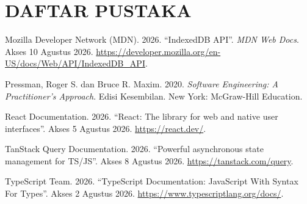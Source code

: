 \clearpage
\chapter*{DAFTAR PUSTAKA}

\begin{enumerate}[label={[\arabic*]}]
  \item Mozilla Developer Network (MDN). 2026. ``IndexedDB API''. \textit{MDN Web Docs}. Akses 10 Agustus 2026. \url{https://developer.mozilla.org/en-US/docs/Web/API/IndexedDB_API}.
  \item Pressman, Roger S. dan Bruce R. Maxim. 2020. \textit{Software Engineering: A Practitioner's Approach}. Edisi Kesembilan. New York: McGraw-Hill Education.
  \item React Documentation. 2026. ``React: The library for web and native user interfaces''. Akses 5 Agustus 2026. \url{https://react.dev/}.
  \item TanStack Query Documentation. 2026. ``Powerful asynchronous state management for TS/JS''. Akses 8 Agustus 2026. \url{https://tanstack.com/query}.
  \item TypeScript Team. 2026. ``TypeScript Documentation: JavaScript With Syntax For Types''. Akses 2 Agustus 2026. \url{https://www.typescriptlang.org/docs/}.
\end{enumerate}
